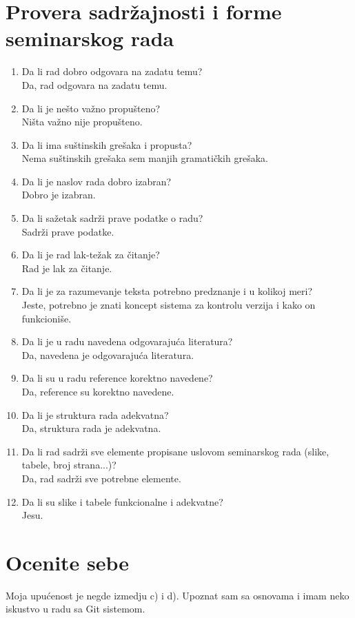 \documentclass[a4paper]{report}
\begin{document}
\section{Provera sadržajnosti i forme seminarskog rada}

\begin{enumerate}
\item Da li rad dobro odgovara na zadatu temu?\\
Da, rad odgovara na zadatu temu.
\item Da li je nešto važno propušteno?\\
Ništa važno nije propušteno.
\item Da li ima suštinskih grešaka i propusta?\\
Nema suštinskih grešaka sem manjih gramatičkih grešaka.
\item Da li je naslov rada dobro izabran?\\
Dobro je izabran.
\item Da li sažetak sadrži prave podatke o radu?\\
Sadrži prave podatke.
\item Da li je rad lak-težak za čitanje?\\
Rad je lak za čitanje.
\item Da li je za razumevanje teksta potrebno predznanje i u kolikoj meri?\\
Jeste, potrebno je znati koncept sistema za kontrolu verzija i kako on funkcioniše.
\item Da li je u radu navedena odgovarajuća literatura?\\
Da, navedena je odgovarajuća literatura.
\item Da li su u radu reference korektno navedene?\\
Da, reference su korektno navedene.
\item Da li je struktura rada adekvatna?\\
Da, struktura rada je adekvatna.
\item Da li rad sadrži sve elemente propisane uslovom seminarskog rada (slike, tabele, broj strana...)?\\
Da, rad sadrži sve potrebne elemente.
\item Da li su slike i tabele funkcionalne i adekvatne?\\
Jesu.
\end{enumerate}

\section{Ocenite sebe}
Moja upućenost je negde izmedju c) i d). Upoznat sam sa osnovama i imam neko iskustvo u radu sa Git sistemom.
\end{document}
